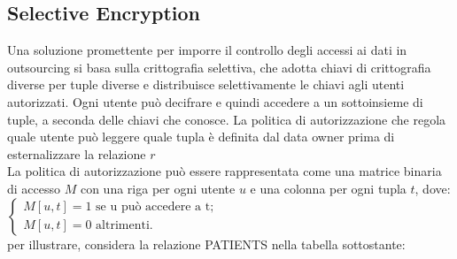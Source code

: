 \subsection{Selective Encryption}
Una soluzione promettente per imporre il controllo degli accessi ai dati in outsourcing si basa sulla crittografia selettiva, che adotta chiavi di crittografia diverse per tuple diverse e distribuisce selettivamente le chiavi agli utenti autorizzati. Ogni utente può decifrare e quindi accedere a un sottoinsieme di tuple, a seconda delle chiavi che conosce. La politica di autorizzazione che regola quale utente può leggere quale tupla è definita dal data owner prima di esternalizzare la relazione $r$
\\
\newline
La politica di autorizzazione può essere rappresentata come una matrice binaria di accesso $M$ con una riga per ogni utente $u$ e una colonna per ogni tupla $t$, dove:\\
\newline
$\begin{cases}
    M[u,t]=1 \text{ se u può accedere a t};\\
    M[u,t]=0 \text{ altrimenti}.   
\end{cases}$\\
\newline
per illustrare, considera la relazione PATIENTS nella tabella sottostante:

